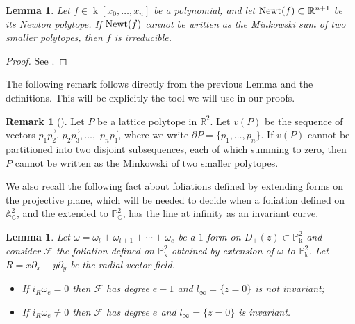 \documentclass[reqno,oneside,11pt]{amsart}
\newtheorem{lemma}[thm]{Lemma}
\theoremstyle{definition}
\newtheorem{OBS}[thm]{Remark}
\DeclareMathOperator{\field}{k}
\begin{document}
\begin{lemma} \label{lemma:irreduciblepolynomial}
    Let $f \in \field[x_0,\dots,x_n]$ be a polynomial, and let ${\rm Newt}(f) \subset \mathbb{R}^{n+1}$ be its Newton polytope. If ${\rm Newt}(f)$ cannot be written as the Minkowski sum of two smaller polytopes, then $f$ is irreducible.
\end{lemma}
\begin{proof} See \cite[Lemma 2.1]{MR1816701}.
\end{proof}

The following remark follows directly from the previous Lemma and the definitions. This will be explicitly the tool we will use in our proofs. 

\begin{OBS}[{{\cite{14080}}}] \label{irreduciblitycriterion}
    Let $P$ be a lattice polytope in $\mathbb{R}^2$. Let $v(P)$ be the sequence of vectors $\overrightarrow{p_1 p_2}$, $\overrightarrow{p_2p_3}, \dots,$ $\overrightarrow{p_np_1}$, where we write $\partial P = \{p_1,\dots,p_n\}$. If $v(P)$ cannot be partitioned into two disjoint subsequences, each of which summing to zero, then $P$ cannot be written as the Minkowski of two smaller polytopes.
\end{OBS}

We also recall the following fact about foliations defined by extending forms on the projective plane, which will be needed to decide when a foliation defined on $\mathbb{A}^2_{\mathbb{C}}$, and the extended to $\mathbb{P}^2_{\mathbb{C}}$, has the line at infinity as an invariant curve.

\begin{lemma}\label{lineinf} Let $\omega = \omega_{l}+\omega_{l+1}+\cdots+\omega_{e}$ be a $1$-form on $D_{+}(z)\subset \mathbb{P}_{\field}^{2}$ and consider $\mathcal{F}$ the foliation defined on $\mathbb{P}_{\field}^{2}$ obtained by extension of $\omega$ to $\mathbb{P}_{\field}^{2}$. Let $R = x\partial_{x}+y\partial_{y}$ be the radial vector field.

        \begin{itemize}
            \item  If $i_{R}\omega_e =  0$ then $\mathcal{F}$ has degree $e-1$ and $l_{\infty} = \{z=0\}$ is not invariant;
            \item  If $i_{R}\omega_e \neq  0$ then $\mathcal{F}$ has degree $e$ and $l_{\infty} = \{z=0\}$ is invariant.
        \end{itemize}
        
\end{lemma}
\end{document}
